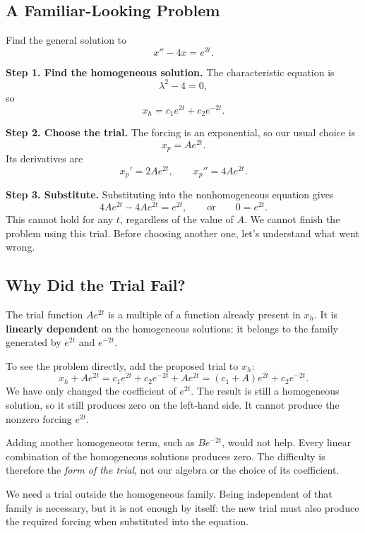\documentclass[10pt,letterpaper]{article}
\begin{document}
\subsection{A Familiar-Looking Problem}
\begin{example}{Find the general solution to
\[
x''-4x=e^{2t}.
\]}

\textbf{Step 1. Find the homogeneous solution.}
The characteristic equation is
\[
\lambda^2-4=0,
\]
so
\[
x_h=c_1e^{2t}+c_2e^{-2t}.
\]

\textbf{Step 2. Choose the trial.}
The forcing is an exponential, so our usual choice is
\[
x_p=Ae^{2t}.
\]
Its derivatives are
\[
x_p'=2Ae^{2t},
\qquad x_p''=4Ae^{2t}.
\]

\textbf{Step 3. Substitute.}
Substituting into the nonhomogeneous equation gives
\[
4Ae^{2t}-4Ae^{2t}=e^{2t},
\qquad\text{or}\qquad
0=e^{2t}.
\]
This cannot hold for any $t$, regardless of the value of $A$. We cannot finish the problem using this trial. Before choosing another
one, let's understand what went wrong.
\end{example}

\subsection{Why Did the Trial Fail?}
The trial function $Ae^{2t}$ is a multiple of a function already
present in $x_h$. It is \textbf{linearly dependent} on the homogeneous
solutions: it belongs to the family generated by $e^{2t}$ and $e^{-2t}$.

To see the problem directly, add the proposed trial to $x_h$:
\[
x_h+Ae^{2t}
=c_1e^{2t}+c_2e^{-2t}+Ae^{2t}
=(c_1+A)e^{2t}+c_2e^{-2t}.
\]
We have only changed the coefficient of $e^{2t}$. The result is still
a homogeneous solution, so it still produces zero on the left-hand side.
It cannot produce the nonzero forcing $e^{2t}$.

Adding another homogeneous term, such as $Be^{-2t}$, would not help.
Every linear combination of the homogeneous solutions produces zero.
The difficulty is therefore the \emph{form of the trial}, not our algebra
or the choice of its coefficient.

We need a trial outside the homogeneous family.
Being independent of that family is necessary, but it is not enough
by itself: the new trial must also produce the required forcing
when substituted into the equation.
\end{document}
